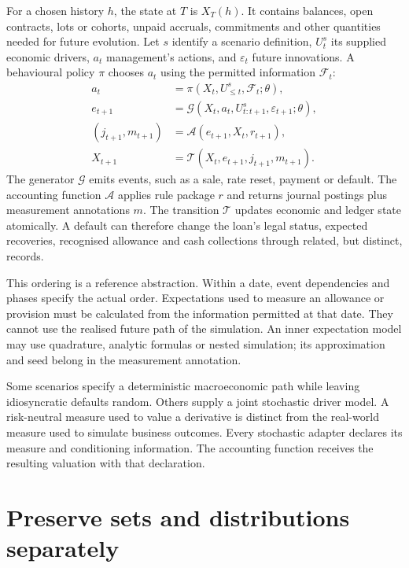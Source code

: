 For a chosen history $h$, the state at $T$ is $X_T(h)$. It contains balances,
open contracts, lots or cohorts, unpaid accruals, commitments and other
quantities needed for future evolution. Let $s$ identify a scenario definition,
$U_t^s$ its supplied economic drivers, $a_t$ management's actions, and
$\varepsilon_t$ future innovations. A behavioural policy $\pi$ chooses
$a_t$ using the permitted information $\mathcal{F}_t$:
\begin{align}
 a_t&=\pi(X_t,U_{\leq t}^s,\mathcal{F}_t;\theta),\label{eq:actions}\\
 e_{t+1}&=\mathcal G(X_t,a_t,U_{t:t+1}^s,\varepsilon_{t+1};\theta),\label{eq:events}\\
 (j_{t+1},m_{t+1})&=\mathcal A(e_{t+1},X_t,r_{t+1}),\label{eq:account}\\
 X_{t+1}&=\mathcal T(X_t,e_{t+1},j_{t+1},m_{t+1}).\label{eq:transition}
\end{align}
The generator $\mathcal G$ emits events, such as a sale, rate reset, payment or default.
The accounting function $\mathcal A$ applies rule package $r$ and returns journal
postings plus measurement annotations $m$. The transition $\mathcal T$ updates economic
and ledger state atomically. A default can therefore change the loan's legal
status, expected recoveries, recognised allowance and cash collections through
related, but distinct, records.

This ordering is a reference abstraction. Within a date, event dependencies
and phases specify the actual order. Expectations used to measure an allowance
or provision must be calculated from the information permitted at that date.
They cannot use the realised future path of the simulation. An inner
expectation model may use quadrature, analytic formulas or nested simulation;
its approximation and seed belong in the measurement annotation.

Some scenarios specify a deterministic macroeconomic path while leaving
idiosyncratic defaults random. Others supply a joint stochastic driver model.
A risk-neutral measure used to value a derivative is distinct from the
real-world measure used to simulate business outcomes. Every stochastic
adapter declares its measure and conditioning information. The accounting
function receives the resulting valuation with that declaration.

\section{Preserve sets and distributions separately}

